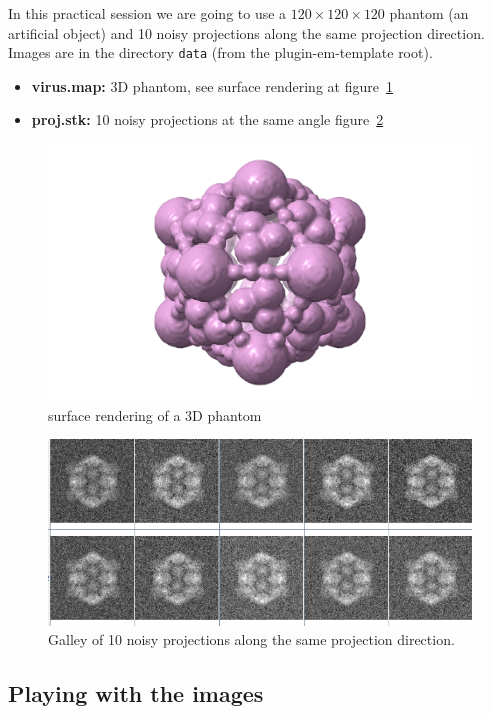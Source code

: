 \documentclass[12pt]{article} %
\newcommand{\ttt}[1]{\texttt{#1}}
\begin{document}
   In this practical session we are going to use a $120\times120\times120$ phantom (an artificial object) and 10 noisy projections along the same projection direction. Images are in the directory \ttt{data} (from the plugin-em-template root).
   
   \begin{itemize}
    \item {\bf virus.map:} 3D phantom, see surface rendering at figure~\ref{fig:rendering}
    \item {\bf proj.stk:} 10 noisy projections at the same angle figure~\ref{fig:proj}
   \end{itemize}

\begin{figure}[H]
\centering 
\includegraphics[scale=.2]{images/virus.png} 
\caption{surface rendering of a 3D phantom} 
\label{fig:rendering}
\end{figure}
\begin{figure}[H]
\centering 
\includegraphics[scale=1]{images/proj.png} 
\caption{Galley of 10 noisy projections along the same projection direction.} 
\label{fig:proj}
\end{figure}

\subsection{Playing with the images}
\end{document}
